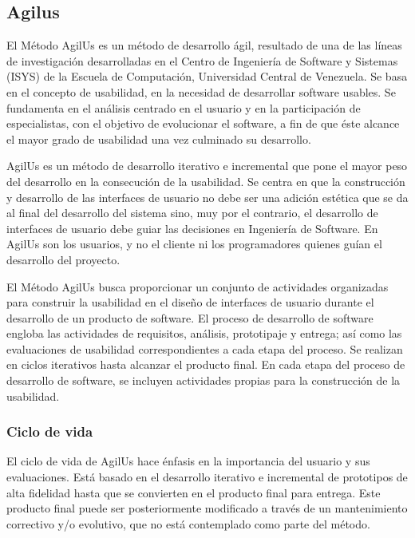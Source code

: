 

\subsection{Agilus}
\setlength{\parskip}{5mm}

	El Método AgilUs es un método de desarrollo ágil, resultado de una de las líneas de investigación desarrolladas en el Centro de Ingeniería de Software y Sistemas (ISYS) de la Escuela de Computación, Universidad Central de Venezuela. Se basa en el concepto de usabilidad, en la necesidad de desarrollar software usables. Se fundamenta en el análisis centrado en el usuario y en la participación de especialistas, con el objetivo de evolucionar el software, a fin de que éste alcance el mayor grado de usabilidad una vez culminado su desarrollo.
	
	AgilUs es un método de desarrollo iterativo e incremental que pone el mayor peso del desarrollo en la consecución de la usabilidad. Se centra en que la construcción y desarrollo de las interfaces de usuario no debe ser una adición estética que se da al final del desarrollo del sistema sino, muy por el contrario, el desarrollo de interfaces de usuario debe guiar las decisiones en Ingeniería de Software. En AgilUs son los usuarios, y no el cliente ni los programadores quienes guían el desarrollo del proyecto.

	El Método AgilUs busca proporcionar un conjunto de actividades organizadas para construir la usabilidad en el diseño de interfaces de usuario durante el desarrollo de un producto de software. El proceso de desarrollo de software engloba las actividades de requisitos, análisis, prototipaje y entrega; así como las evaluaciones de usabilidad correspondientes a cada etapa del proceso. Se realizan en ciclos iterativos hasta alcanzar el producto final. En cada etapa del proceso de desarrollo de software, se incluyen actividades propias para la construcción de la usabilidad.

\setlength{\parskip}{0mm}

\subsubsection{Ciclo de vida}
\setlength{\parskip}{5mm}
	El ciclo de vida de AgilUs hace énfasis en la importancia del usuario y sus evaluaciones. Está basado en el desarrollo iterativo e incremental de prototipos de alta fidelidad hasta que se convierten en el producto final para entrega. Este producto final puede ser posteriormente modificado a través de un mantenimiento correctivo y/o evolutivo, que no está contemplado como parte del método.
	\setlength{\parskip}{0mm}

